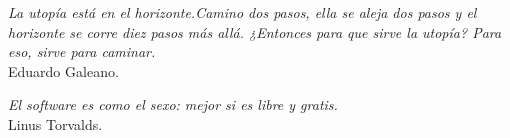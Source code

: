\newpage
\bigskip
\bigskip
\begin{flushright}
\emph{La utopía está en el horizonte.Camino dos pasos, ella se aleja dos pasos y el horizonte se corre diez pasos más allá. ¿Entonces para que sirve la utopía? Para eso, sirve para caminar.}\\
Eduardo Galeano.

\medskip

\emph{El software es como el sexo: mejor si es libre y gratis.}\\
Linus Torvalds.
\end{flushright}
